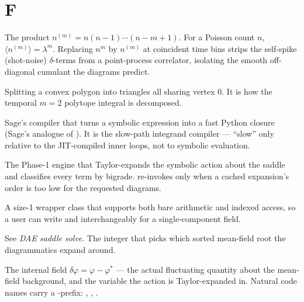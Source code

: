 \section*{F}
\begin{description}[leftmargin=0pt,style=nextline]

  \item[Factorial moment / falling factorial] The product
        $n^{(m)}=n(n-1)\cdots(n-m+1)$. For a Poisson count $n$,
        $\langle n^{(m)}\rangle=\lambda^{m}$. Replacing $n^{m}$ by $n^{(m)}$ at
        coincident time bins strips the self-spike (shot-noise) $\delta$-terms from
        a point-process correlator, isolating the smooth off-diagonal cumulant the
        diagrams predict.

  \item[Fan triangulation] Splitting a convex polygon into triangles all sharing
        vertex $0$. It is how the temporal $m=2$ polytope integral is decomposed.

  \item[\code{fast\_callable}] Sage's compiler that turns a symbolic expression into
        a fast Python closure (Sage's analogue of ). It is the
        slow-path integrand compiler --- ``slow'' only relative to the JIT-compiled
        inner loops, not to symbolic evaluation.

  \item[\code{FieldTheory} / \code{expand()}] The Phase-1 engine that
        Taylor-expands the symbolic action about the saddle and classifies every
        term by bigrade.  re-invokes 
        only when a cached expansion's order is too low for the requested diagrams.

  \item[\code{\_FieldScalar}] A size-1 wrapper class that supports both bare
        arithmetic and indexed access, so a user can write  and
         interchangeably for a single-component field.

  \item[Fixed-point index] See \emph{DAE saddle solve}. The integer that picks which
        sorted mean-field root the diagrammatics expand around.

  \item[Fluctuation field] The internal field $\delta\varphi=\varphi-\varphi^{*}$
        --- the actual fluctuating quantity about the mean-field background, and the
        variable the action is Taylor-expanded in. Natural code names carry a
        -prefix: , , .


\end{description}
